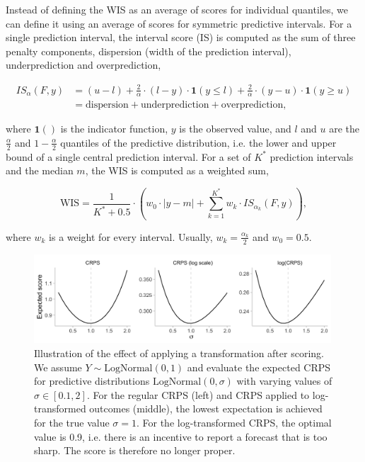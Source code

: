 \documentclass{article}
\begin{document}
Instead of defining the WIS as an average of scores for individual quantiles, we can define it using an average of scores for symmetric predictive intervals. For a single prediction interval, the interval score (IS) is computed as the sum of three penalty components, dispersion (width of the prediction interval), underprediction and overprediction,  
%
\begin{linenomath*}
\begin{align}
 IS_\alpha(F,y) &= (u-l) + \frac{2}{\alpha} \cdot (l-y) \cdot \boldsymbol{1}(y \leq l) + \frac{2}{\alpha} \cdot (y-u) \cdot \boldsymbol{1}(y \geq u) \\
 &= \text{dispersion} + \text{underprediction} + \text{overprediction},    
\end{align}
\end{linenomath*}
%
where $\boldsymbol{1}()$ is the indicator function, $y$ is the observed value, and $l$ and $u$ are the $\frac{\alpha}{2}$ and $1 - \frac{\alpha}{2}$ quantiles of the predictive distribution, i.e. the lower and upper bound of a single central prediction interval. For a set of $K^*$ prediction intervals and the median $m$, the WIS is computed as a weighted sum, 
\begin{linenomath*}
\begin{equation}
\text{WIS} = \frac{1}{K^* + 0.5} \cdot \left(w_0 \cdot |y - m| + \sum_{k = 1}^{K^*} w_k \cdot IS_{\alpha_{k}}(F, y)\right),    
\end{equation} 
\end{linenomath*}
where $w_k$ is a weight for every interval. Usually, $w_k = \frac{\alpha_k}{2}$ and $w_0 = 0.5$. 

\begin{figure}[h!]
    \centering
    \includegraphics[width=0.99\textwidth]{output/figures/example-log-first.png}
    \caption{Illustration of the effect of applying a transformation after scoring. We assume $Y \sim \text{LogNormal}(0, 1)$ and evaluate the expected CRPS for predictive distributions $\text{LogNormal}(0, \sigma)$ with varying values of $\sigma \in [0.1, 2]$. For the regular CRPS (left) and CRPS applied to log-transformed outcomes (middle), the lowest expectation is achieved for the true value $\sigma = 1$. For the log-transformed CRPS, the optimal value is  0.9, i.e. there is an incentive to report a forecast that is too sharp. The score is therefore no longer proper.}
    \label{fig:log-improper}
\end{figure}
\end{document}
